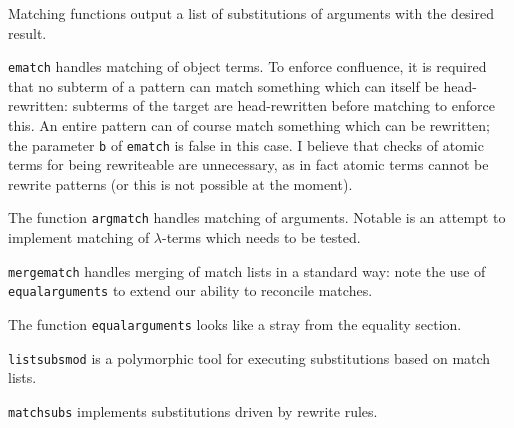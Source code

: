 \documentclass{article}
\begin{document}
Matching functions output a list of substitutions of arguments with the desired result.

{\tt ematch} handles matching of object terms.  To enforce confluence, it is required that no subterm of a pattern can match something which can itself be head-rewritten:
subterms of the target are head-rewritten before matching to enforce this.  An entire pattern can of course match something which can be rewritten;  the parameter
{\tt b} of {\tt ematch} is false in this case.  I believe that checks of atomic terms for being rewriteable are unnecessary, as in fact atomic terms cannot be rewrite patterns (or this is not possible at the moment).

The function {\tt argmatch} handles matching of arguments.  Notable is an attempt to implement matching of $\lambda$-terms which needs to be tested.

{\tt mergematch} handles merging of match lists in a standard way:  note the use of {\tt equalarguments} to extend our ability to reconcile matches.

The function {\tt equalarguments} looks like a stray from the equality section.

{\tt listsubsmod} is a polymorphic tool for executing substitutions based on match lists.

{\tt matchsubs} implements substitutions driven by rewrite rules.
\end{document}
